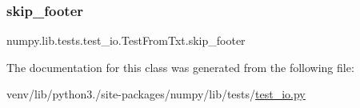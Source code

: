 \subsubsection{\texorpdfstring{skip\+\_\+footer}{skip\_footer}}
{\footnotesize\ttfamily numpy.\+lib.\+tests.\+test\+\_\+io.\+Test\+From\+Txt.\+skip\+\_\+footer\hspace{0.3cm}{\ttfamily [static]}}



The documentation for this class was generated from the following file\+:\begin{DoxyCompactItemize}
\item 
venv/lib/python3./site-\/packages/numpy/lib/tests/\hyperlink{test__io_8py}{test\+\_\+io.\+py}\end{DoxyCompactItemize}
